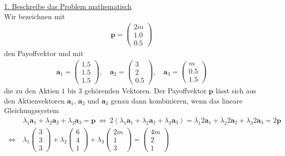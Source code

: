 \underline{1. Beschreibe das Problem mathematisch}\\
Wir bezeichnen mit
\begin{align*}
\textbf{p} = 
\begin{pmatrix}
2m \\ 1.0 \\ 0.5
\end{pmatrix}
\end{align*}
den Payoffvektor und mit 
\begin{align*}
\textbf{a}_1 = 
\begin{pmatrix}
1.5\\ 1.5 \\1.5
\end{pmatrix}, \quad
\textbf{a}_2
=
\begin{pmatrix}
3 \\ 2 \\ 0.5
\end{pmatrix}, \quad
\textbf{a}_3 
=
\begin{pmatrix}
m \\ 0.5 \\1.5
\end{pmatrix}
\end{align*}
die zu den Aktien $ 1 $ bis $ 3 $ gehörenden Vektoren. Der Payoffvektor $ \textbf{p} $ lässt sich aus den Aktienvektoren $ \textbf{a}_1 $, $ \textbf{a}_2 $ und $ \textbf{a}_3 $ genau dann kombinieren, wenn das lineare Gleichungssystem
\begin{align*}
&\lambda_1 \textbf{a}_1 + \lambda_2 \textbf{a}_2 + \lambda_3 \textbf{a}_3 = \textbf{p}
\ \Leftrightarrow \ 
2 ( \lambda_1 \textbf{a}_1 + \lambda_2 \textbf{a}_2 + \lambda_3 \textbf{a}_3 ) = \lambda_1 2\textbf{a}_1 + \lambda_2 2\textbf{a}_2 + \lambda_3 2\textbf{a}_3  = 2 \textbf{p}\\
\ \Leftrightarrow \
&\lambda_1
\begin{pmatrix}
3 \\ 3  \\ 3 
\end{pmatrix}
+ \lambda_2 
\begin{pmatrix}
6 \\ 4 \\ 1 
\end{pmatrix}
+ \lambda_3
\begin{pmatrix}
2m \\ 1 \\ 3
\end{pmatrix}
=
\begin{pmatrix}
4m\\ 2 \\ 1
\end{pmatrix}
\end{align*}
